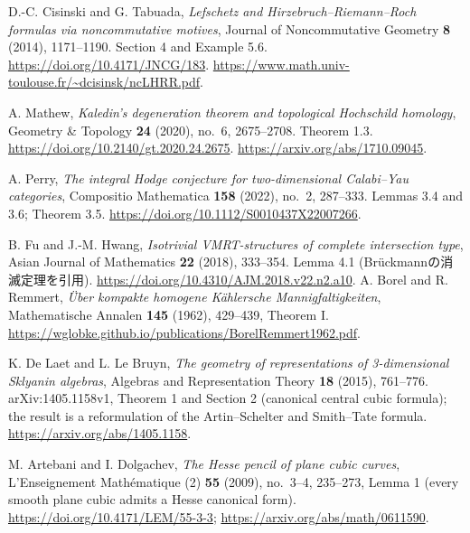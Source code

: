 D.-C. Cisinski and G. Tabuada,
\emph{Lefschetz and Hirzebruch--Riemann--Roch formulas via noncommutative motives},
Journal of Noncommutative Geometry \textbf{8} (2014), 1171--1190.
Section 4 and Example 5.6.
\url{https://doi.org/10.4171/JNCG/183}.
\url{https://www.math.univ-toulouse.fr/~dcisinsk/ncLHRR.pdf}.

A. Mathew,
\emph{Kaledin's degeneration theorem and topological Hochschild homology},
Geometry \& Topology \textbf{24} (2020), no.~6, 2675--2708.
Theorem 1.3.
\url{https://doi.org/10.2140/gt.2020.24.2675}.
\url{https://arxiv.org/abs/1710.09045}.

A. Perry,
\emph{The integral Hodge conjecture for two-dimensional Calabi--Yau categories},
Compositio Mathematica \textbf{158} (2022), no.~2, 287--333.
Lemmas 3.4 and 3.6; Theorem 3.5.
\url{https://doi.org/10.1112/S0010437X22007266}.

B. Fu and J.-M. Hwang,
\emph{Isotrivial VMRT-structures of complete intersection type},
Asian Journal of Mathematics \textbf{22} (2018), 333--354.
Lemma 4.1 (Br\"uckmannの消滅定理を引用).
\url{https://doi.org/10.4310/AJM.2018.v22.n2.a10}.
A. Borel and R. Remmert,
\emph{\"Uber kompakte homogene K\"ahlersche Mannigfaltigkeiten},
Mathematische Annalen \textbf{145} (1962), 429--439, Theorem I.
\url{https://wglobke.github.io/publications/BorelRemmert1962.pdf}.

K. De Laet and L. Le Bruyn,
\emph{The geometry of representations of 3-dimensional Sklyanin algebras},
Algebras and Representation Theory \textbf{18} (2015), 761--776.
arXiv:1405.1158v1, Theorem 1 and Section 2 (canonical central cubic formula);
the result is a reformulation of the Artin--Schelter and Smith--Tate formula.
\url{https://arxiv.org/abs/1405.1158}.

M. Artebani and I. Dolgachev,
\emph{The Hesse pencil of plane cubic curves},
L'Enseignement Math\'ematique (2) \textbf{55} (2009), no.~3--4, 235--273,
Lemma 1 (every smooth plane cubic admits a Hesse canonical form).
\url{https://doi.org/10.4171/LEM/55-3-3};
\url{https://arxiv.org/abs/math/0611590}.
